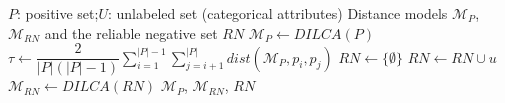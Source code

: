 \documentclass{article}
\begin{document}
\begin{algorithm}[!h]
\renewcommand{\algorithmicrequire}{\textbf{Input:}}
\renewcommand{\algorithmicensure}{\textbf{Output:}}
	\caption{Pulce$(P,U)$: PU learning in categorical data}
	\begin{algorithmic}[1]
	    \REQUIRE
	    $P$: positive set;\quad $U$: unlabeled set (categorical attributes)
	    \ENSURE
	    Distance models $\mathcal{M}_{P}$, $\mathcal{M}_{RN}$ and the reliable negative set $RN$
	    \STATE $\mathcal{M}_{P}\leftarrow DILCA(P)$ %
	    \STATE $\tau\leftarrow \dfrac{2}{|P|(|P|-1)}\sum_{i=1}^{|P|-1}\sum_{j=i+1}^{|P|}
	    dist(\mathcal{M}_{P},p_{i},p_{j})$ %
	    \STATE $RN\leftarrow \{\emptyset\}$
	    \STATE $RN\leftarrow RN\cup u$ %
	    \ENDIF
	    \ENDFOR
	    \STATE $\mathcal{M}_{RN}\leftarrow DILCA(RN)$ %
		\RETURN $\mathcal{M}_{P}$, $\mathcal{M}_{RN}$, $RN$
	\end{algorithmic}
\end{algorithm}
\end{document}
